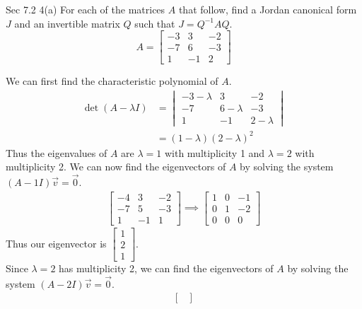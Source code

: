 \documentclass[answers,12pt,addpoints]{exam}
\begin{document}
\begin{questions}
    \question Sec 7.2 4(a)
    For each of the matrices $A$ that follow, find a Jordan canonical form $J$  and an invertible matrix $Q$ such that $J = Q^{-1}AQ$. 
    $$ A = \begin{bmatrix}
        -3 & 3 & -2 \\
        -7 & 6 & -3 \\
        1 & -1 & 2
    \end{bmatrix}$$
    \begin{solution}
        We can first find the characteristic polynomial of $A$.
        \begin{align*}
            \det(A - \lambda I) &= \begin{vmatrix}
                -3 - \lambda & 3 & -2 \\
                -7 & 6 - \lambda & -3 \\
                1 & -1 & 2 - \lambda
            \end{vmatrix} \\
            &= (1- \lambda)(2-\lambda)^2
        \end{align*}
        Thus the eigenvalues of $A$ are $\lambda = 1$ with multiplicity 1 and $\lambda = 2$ with multiplicity 2. We can now find the eigenvectors of $A$ by solving the system $(A - 1I)\vec{v} = \vec{0}$.
        \begin{align*}
            \begin{bmatrix}
                -4 & 3 & -2 \\
                -7 & 5 & -3 \\
                1 & -1 & 1
            \end{bmatrix}
            \implies \begin{bmatrix}
                1 & 0 & -1 \\
                0 & 1 & -2 \\
                0 & 0 & 0
            \end{bmatrix}
        \end{align*}
        Thus our eigenvector is $\begin{bmatrix} 1\\ 2\\ 1 \end{bmatrix}$. \\
        Since $\lambda = 2$ has multiplicity 2, we can find the eigenvectors of $A$ by solving the system $(A - 2I)\vec{v} = \vec{0}$.
        \begin{align*}
            \begin{bmatrix}

\end{bmatrix}
\end{align*}
\end{solution}
\end{questions}
\end{document}

